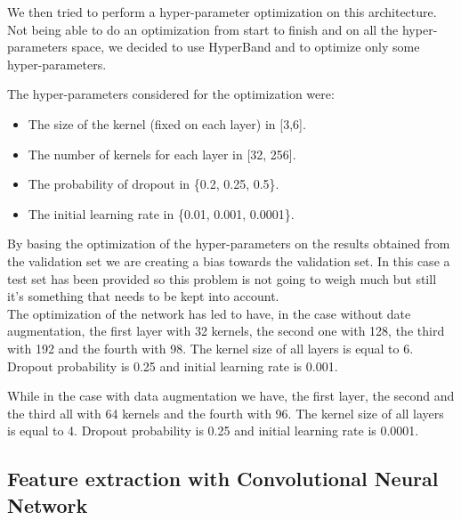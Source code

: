 We then tried to perform a hyper-parameter optimization on this architecture.
Not being able to do an optimization from start to finish and on all the hyper-parameters space, we decided to use HyperBand and to optimize only some hyper-parameters.

The hyper-parameters considered for the optimization were: 
\begin{itemize}
    \item The size of the kernel (fixed on each layer) in [3,6].
    \item The number of kernels for each layer in [32, 256].
    \item The probability of dropout in \{0.2, 0.25, 0.5\}.
    \item The initial learning rate in \{0.01, 0.001, 0.0001\}.
\end{itemize}

By basing the optimization of the hyper-parameters on the results obtained from the validation set we are creating a bias towards the validation set. In this case a test set has been provided so this problem is not going to weigh much but still it's something that needs to be kept into account. \\

The optimization of the network has led to have, in the case without date augmentation, the first layer with 32 kernels, the second one with 128, the third with 192 and the fourth with 98. The kernel size of all layers is equal to 6. Dropout probability is 0.25 and initial learning rate is 0.001.

While in the case with data augmentation we have, the first layer, the second and the third all with 64 kernels and the fourth with 96. The kernel size of all layers is equal to 4. Dropout probability is 0.25 and initial learning rate is 0.0001.

\subsection{Feature extraction with Convolutional Neural Network}

